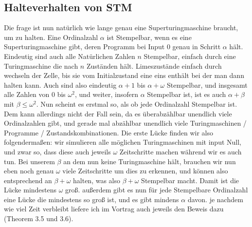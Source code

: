 \documentclass{scrartcl}
\begin{document}
\subsection{Halteverhalten von STM}
Die frage ist nun natürlich wie lange genau eine Superturingmaschine braucht,
um zu halten. Eine Ordinalzahl $\alpha$ ist Stempelbar, wenn es eine
Superturingmaschine gibt, deren Programm bei Input 0 genau in Schritt $\alpha$
hält. Eindeutig sind auch
alle Natürlichen Zahlen $n$ Stempelbar, einfach durch eine Turingmaschine die
nach $n$ Zuständen hält. Limeszustände einfach durch wechseln der Zelle, bis
sie vom Initialzustand eine eins enthält bei der man dann halten kann.
Auch sind also eindeutig $\alpha + 1$ bis $\alpha + \omega$ Stempelbar, und
insgesamt alle Zahlen von $0$ bis $\omega^2$, und weiter, insofern $\alpha$
Stempelbar ist, ist es auch $\alpha + \beta$ mit $\beta \leq \omega^2$.
Nun scheint es erstmal so, als ob jede Ordinalzahl Stempelbar ist. Dem kann
allerdings nicht der Fall sein, da es überabzählbar unendlich viele
Ordinalzahlen gibt, und gerade mal abzählbar unendlich viele Turingmaschinen /
Programme / Zustandskombinationen. Die erste Lücke finden wir also
folgendermaßen: wir simulieren alle möglichen Turingmaschinen mit input Null,
und zwar so, dass diese auch jeweils $\omega$ Zeitschritte machen während wir
es auch tun. Bei unserem $\beta$ an dem nun keine Turingmaschine hält, brauchen
wir nun eben noch genau $\omega$ viele Zeitschritte um dies zu erkennen, und
können also entsprechend an $\beta + \omega$ halten, was also $\beta + \omega$
Stempelbar macht. Damit ist die Lücke mindestens $\omega$ groß. außerdem gibt
es nun für jede Stempelbare Ordinalzahl eine Lücke die mindestens so groß ist,
und es gibt mindens $\alpha$ davon. je nachdem wie viel Zeit verbleibt liefere
ich im Vortrag auch jeweils den Beweis dazu (Theorem 3.5 und 3.6).
\end{document}

